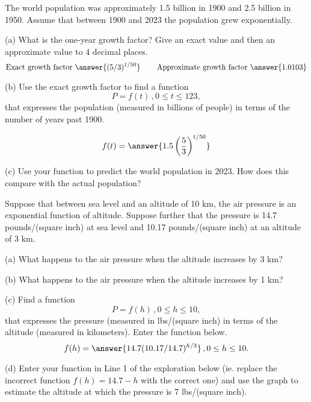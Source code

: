 \documentclass{ximera}
\begin{document}
\begin{question}   \label{Q6:ExponentialG}
The world population was approximately 1.5 billion in 1900 and 2.5 billion in 1950. Assume that between 1900 and 2023 the population grew exponentially.

(a) What is the one-year growth factor? Give an exact value and then an approximate value to 4 decimal places.
\[
   \text{Exact growth factor }  \answer{(5/3)^{1/50}} \hskip 0.3 in  \text{Approximate growth factor } \answer{1.0103}
\]

(b) Use the exact growth factor to find a function
\[
     P = f(t) \, , 0\leq t \leq 123 ,
\]
that expresses the population (measured in billions of people) in terms of the number of years past 1900.

\[
   f(t) = \answer{1.5 \left(\frac{5}{3}\right)^{t/50}}
\]

(c) Use your function to predict the world population in 2023. How does this compare with the actual population?

\end{question}


\begin{question}   \label{Q7:ExponentialG}
Suppose that between sea level and an altitude of 10 km, the air pressure is an exponential function of altitude. Suppose further that the pressure is 14.7 pounds/(square inch) at sea level and 10.17 pounds/(square inch) at an altitude of 3 km.

(a) What happens to the air pressure when the altitude increases by 3 km?

(b) What happens to the air pressure when the altitude increases by 1 km?

(c) Find a function
\[
    P = f(h) \, , 0\leq h \leq 10,
\]
that expresses the pressure (measured in lbs/(square inch) in terms of the altitude (measured in kilometers). Enter the function below.
\[
      f(h) = \answer{14.7(10.17/14.7)^{h/3}} \, , 0\leq h \leq 10 .
\]

(d) Enter your function in Line 1 of the exploration below (ie. replace the incorrect function $f(h)=14.7-h$ with the correct one) and use the graph to estimate the altitude at which the pressure is 7 lbs/(square inch).

\begin{exploration}

 
\begin{onlineOnly}
    \begin{center}
\end{center}
\end{onlineOnly}
\end{exploration}

\end{question}
\end{document}
